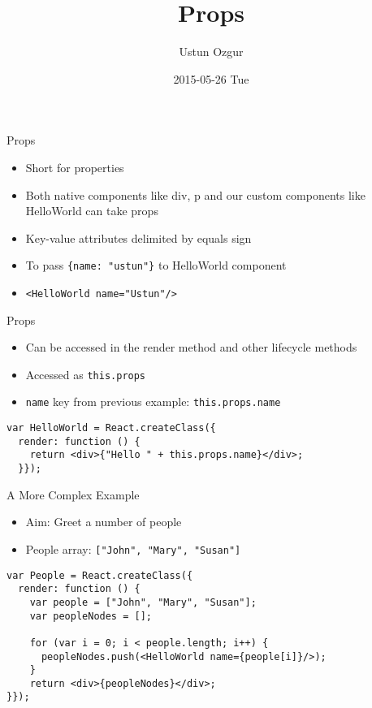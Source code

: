 \documentclass[presentation]{beamer}
\author{Ustun Ozgur}
\date{2015-05-26 Tue}
\title{Props}
\begin{document}
\maketitle

\begin{frame}[fragile,label=sec-1]{Props}
 \begin{itemize}
\item Short for properties
\item Both native components like div, p and our custom components like HelloWorld
can take props
\item Key-value attributes delimited by equals sign
\item To pass \texttt{\{name: "ustun"\}} to HelloWorld component
\item \verb~<HelloWorld name="Ustun"/>~
\end{itemize}
\end{frame}

\begin{frame}[fragile,label=sec-2]{Props}
 \begin{itemize}
\item Can be accessed in the render method and other lifecycle methods
\item Accessed as \texttt{this.props}
\item \texttt{name} key from previous example: \texttt{this.props.name}
\end{itemize}
\begin{verbatim}
var HelloWorld = React.createClass({
  render: function () {
    return <div>{"Hello " + this.props.name}</div>;
  }});
\end{verbatim}
\end{frame}

\begin{frame}[fragile,label=sec-3]{A More Complex Example}
 \begin{itemize}
\item Aim: Greet a number of people
\item People array: \texttt{["John", "Mary", "Susan"]}
\end{itemize}

\begin{verbatim}
var People = React.createClass({
  render: function () {
    var people = ["John", "Mary", "Susan"];
    var peopleNodes = [];

    for (var i = 0; i < people.length; i++) {
      peopleNodes.push(<HelloWorld name={people[i]}/>);
    }
    return <div>{peopleNodes}</div>;
}});
\end{verbatim}
\end{frame}
\end{document}
